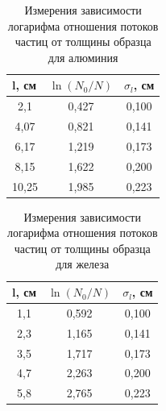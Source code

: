 \documentclass[a4paper,12pt]{article}
\begin{document}
\begin{table}[h]
	\caption{Измерения зависимости логарифма отношения потоков частиц от толщины образца для алюминия}
	\label{table2}
	\centering
	\begin{tabular}{|c|c|c|}
	\hline
	\multicolumn{1}{|l|}{\textbf{l, см}} & \multicolumn{1}{l|}{\textbf{$\ln(N_0/N)$}} & \textbf{$\sigma_l$, см} \\ \hline 
	2,1 & 0,427 & 0,100 \\ \hline
	4,07 & 0,821 & 0,141 \\ \hline
	6,17 & 1,219 & 0,173 \\ \hline
	8,15 & 1,622 & 0,200 \\ \hline
	10,25 & 1,985 & 0,223 \\ \hline
	\end{tabular}
\end{table}

\begin{table}[h]
	\caption{Измерения зависимости логарифма отношения потоков частиц от толщины образца для железа}
	\label{table3}
	\centering
	\begin{tabular}{|c|c|c|}
	\hline
	\multicolumn{1}{|l|}{\textbf{l, см}} & \multicolumn{1}{l|}{\textbf{$\ln(N_0/N)$}} & \textbf{$\sigma_l$, см} \\ \hline
	1,1 & 0,592 & 0,100 \\ \hline
	2,3 & 1,165 & 0,141 \\ \hline
	3,5 & 1,717 & 0,173 \\ \hline
	4,7 & 2,263 & 0,200 \\ \hline
	5,8 & 2,765 & 0,223 \\ \hline
	\end{tabular}
\end{table}
\end{document}
